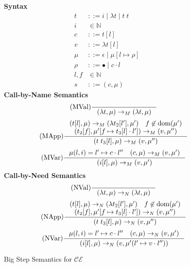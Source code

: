 \begin{figure*}
\textbf{Syntax}
\begin{align*}
\tag{Term} t &::= i \; | \; \lambda t \; | \; t \; t  \\
\tag{Variable} i &\in \mathbb{N}  \\
\tag{Closure} c &::= t [l] \\
\tag{Value} v &::= \lambda t [l] \\
\tag{Heap} \mu &::= \epsilon \; | \; \mu [ l \mapsto \rho ] \\
\tag{Environment} \rho &::= \bullet \; | \; c \cdot l \\
\tag{Location} l,f &\in \mathbb{N}  \\
\tag{State} s &::= (c, \mu)
\end{align*}
\textbf{Call-by-Name Semantics}
\begin{align*}
\tag{MVal} \inference {}{(\lambda t, \mu) \rightarrow_M (\lambda t, \mu)}
\end{align*}
\begin{align*}
\tag{MApp} \inference
{(t[l], \mu) \rightarrow_{M} (\lambda t_2[l'], \mu') \quad f \not \in \textnormal{dom}(\mu') \\ 
(t_2[f], \mu'[f \mapsto t_3[l] \cdot l']) \rightarrow_{M} (v, \mu'')}
{(t \; t_3[l], \mu) \rightarrow_{M} (v, \mu'')}  
\end{align*}
\begin{align*}
\tag{MVar} \inference 
{\mu(l, i) = l' \mapsto c \cdot l'' \quad (c, \mu) \rightarrow_M (v, \mu')}
{(i[l],\mu) \rightarrow_M (v,\mu')}
\end{align*}
\textbf{Call-by-Need Semantics}
\begin{align*}
\tag{NVal} \inference{\quad}{(\lambda t, \mu) \rightarrow_N (\lambda t, \mu)}
\end{align*}
\begin{align*}
\tag{NApp} \inference
{(t[l], \mu) \rightarrow_{N} (\lambda t_2[l'], \mu') \quad f \not \in \textnormal{dom}(\mu') \\ 
(t_2[f], \mu'[f \mapsto t_3[l] \cdot l']) \rightarrow_{N} (v, \mu'')}
{(t \; t_3[l], \mu) \rightarrow_{N} (v, \mu'')}  
\end{align*}
\begin{align*}
\tag{NVar} \inference
{\mu(l, i) = l' \mapsto c \cdot l'' \quad (c, \mu) \rightarrow_N (v, \mu')}
{(i[l],\mu) \rightarrow_N (v, \mu'(l' \mapsto v \cdot l''))}
\end{align*}
\caption{Big Step Semantics for $\mathcal{CE}$}
\label{fig:bigstepcem}
\end{figure*}

